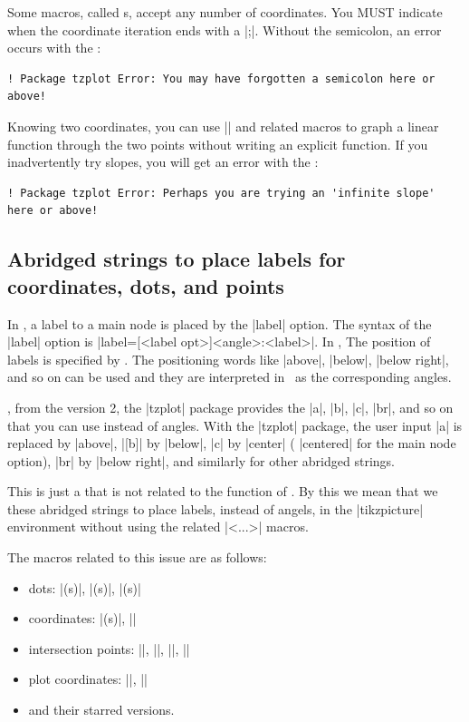 Some macros, called s, accept any number of coordinates. You MUST indicate when the coordinate iteration ends with a  |;|. Without the semicolon, an error occurs with the :
\begin{verbatim}
! Package tzplot Error: You may have forgotten a semicolon here or above!
\end{verbatim}

Knowing two coordinates, you can use |\tzLFn| and related macros to graph a linear function through the two points without writing an explicit function.
If you inadvertently try  slopes, you will get an error with the :
\begin{verbatim}
! Package tzplot Error: Perhaps you are trying an 'infinite slope' here or above!
\end{verbatim}

\subsection{Abridged strings to place labels for coordinates, dots, and points}
\label{ss:string-replacement}

In \Tikz, a label to a main node is placed by the |label| option. The syntax of the |label| option is |label={[<label opt>]<angle>:{<label>}}|.
In \Tikz, The position of labels is specified by . The positioning words like |above|, |below|, |below right|, and so on can be used and they are interpreted in \Tikz\ as the corresponding angles.

, from the version 2, the |tzplot| package provides the  |a|, |b|, |c|, |br|, and so on that you can use instead of angles. With the |tzplot| package, the user input |a| is replaced by |above|, |[b]| by |below|, |c| by |center| ( |centered| for the main node option), |br| by |below right|, and similarly for other abridged strings.

\remark This is just a  that is not related to the function of \Tikz. By this we mean that we  these abridged strings to place labels, instead of angels, in the |tikzpicture| environment without using the related |\tz<...>| macros.

The macros related to this issue are as follows:

\begin{itemize}\tightlist
\item dots: |\tzdot(s)|, |\tzcdots(s)|, |\tznodedot(s)|
\item coordinates: |\tzcoor(s)|, |\tzcoorsquick|
\item intersection points: |\tzXpoint|, |\tzvXpoint|, |\tzhXpoint|, |\tzLFnXpoint|
\item plot coordinates: |\tzplot|, |\tzplotcurve|
\item and their starred versions.
\end{itemize}

